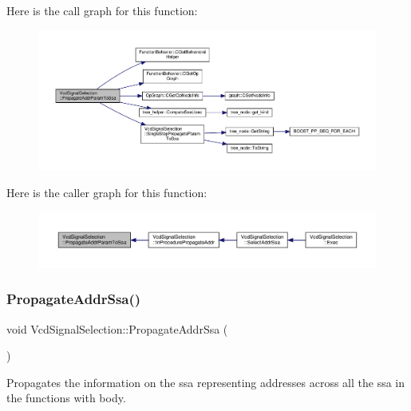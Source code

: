 Here is the call graph for this function\+:
\nopagebreak
\begin{figure}[H]
\begin{center}
\leavevmode
\includegraphics[width=350pt]{dd/de4/classVcdSignalSelection_af1921e71908a17971a4da3ed06f3850b_cgraph}
\end{center}
\end{figure}
Here is the caller graph for this function\+:
\nopagebreak
\begin{figure}[H]
\begin{center}
\leavevmode
\includegraphics[width=350pt]{dd/de4/classVcdSignalSelection_af1921e71908a17971a4da3ed06f3850b_icgraph}
\end{center}
\end{figure}
\mbox{\label{classVcdSignalSelection_a2c6b3c717e45415bbd12fa5f82401b58}} 
\subsubsection{\texorpdfstring{Propagate\+Addr\+Ssa()}{PropagateAddrSsa()}}
{\footnotesize\ttfamily void Vcd\+Signal\+Selection\+::\+Propagate\+Addr\+Ssa (\begin{DoxyParamCaption}{ }\end{DoxyParamCaption})\hspace{0.3cm}{\ttfamily [protected]}}



Propagates the information on the ssa representing addresses across all the ssa in the functions with body. 

